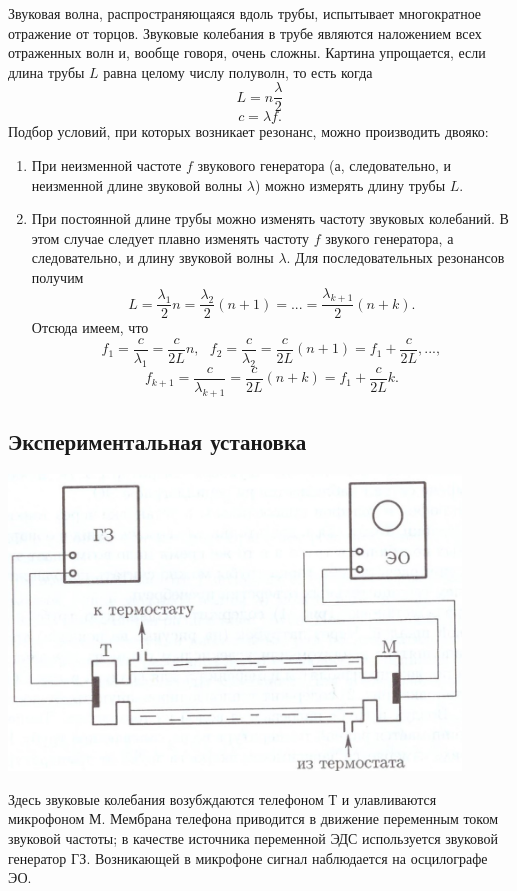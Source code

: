 \documentclass[a4paper, 12pt]{article}%
\begin{document}
Звуковая волна, распространяющаяся вдоль трубы, испытывает многократное отражение от торцов. Звуковые колебания в трубе являются наложением всех отраженных волн и, вообще говоря, очень сложны. Картина упрощается, если длина трубы $L$ равна целому числу полуволн, то есть когда 
\[L = n \dfrac{\lambda}{2}\]
\[c = \lambda f.\]
Подбор условий, при которых возникает резонанс, можно производить двояко:
\begin{enumerate}
\item При неизменной частоте $f$ звукового генератора (а, следовательно, и неизменной длине звуковой волны $\lambda$) можно измерять длину трубы $L$.
\item При постоянной длине трубы можно изменять частоту звуковых колебаний. В этом случае следует плавно изменять частоту $f$ звукого генератора, а следовательно, и длину звуковой волны $\lambda$. Для последовательных резонансов получим 
\[L = \dfrac{\lambda_1}{2}n = \dfrac{\lambda_2}{2}(n+1) = ... = \dfrac{\lambda_{k+1}}{2}(n+k).\]
Отсюда имеем, что 
\[f_1 = \dfrac{c}{\lambda_1} = \dfrac{c}{2L}n, \text{ } f_2 = \dfrac{c}{\lambda_2} = \dfrac{c}{2L}(n+1) = f_1 +  \dfrac{c}{2L},...,\]
\[f_{k+1} = \dfrac{c}{\lambda_{k+1}} = \dfrac{c}{2L}(n+k) = f_1 +  \dfrac{c}{2L}k.\]  
\end{enumerate}
\subsection*{Экспериментальная установка}
\includegraphics[width = 0.9\textwidth]{213_1.jpg}

Здесь звуковые колебания возубждаются телефоном Т и улавливаются микрофоном М. Мембрана телефона приводится в движение переменным током звуковой частоты; в качестве источника переменной ЭДС используется звуковой генератор ГЗ. Возникающей в микрофоне сигнал наблюдается на осцилографе ЭО.
\end{document}
